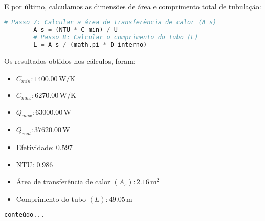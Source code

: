 E por último, calculamos as dimensões de área e comprimento total de tubulação:



\begin{center}
	\begin{lstlisting}[language=python]
		# Passo 7: Calcular a área de transferência de calor (A_s)
		A_s = (NTU * C_min) / U
		# Passo 8: Calcular o comprimento do tubo (L)
		L = A_s / (math.pi * D_interno)
	\end{lstlisting}
\end{center}

Os resultados obtidos nos cálculos, foram:
\begin{itemize}
	\item $C_{min}: 1400.00 \, \mathrm{W/K}$
	\item $C_{max}: 6270.00 \, \mathrm{W/K}$
	\item $Q_{max}: 63000.00 \, \mathrm{W}$
	\item $Q_{real}: 37620.00 \, \mathrm{W}$
	\item Efetividade: $0.597$
	\item NTU: $0.986$
	\item Área de transferência de calor $(A_s): 2.16 \, \mathrm{m^2}$
	\item Comprimento do tubo $(L): 49.05 \, \mathrm{m}$
\end{itemize}



\begin{center}
	\begin{lstlisting}[language=python]
		conteúdo...
	\end{lstlisting}
\end{center}

